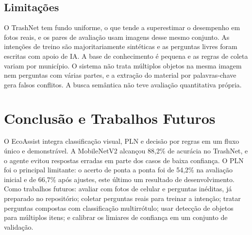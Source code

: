 \documentclass[conference]{IEEEtran}
\begin{document}
\subsection{Limita\c{c}\~oes}
O TrashNet tem fundo uniforme, o que tende a superestimar o desempenho em fotos reais, e os pares de avalia\c{c}\~ao usam imagens desse mesmo conjunto. As inten\c{c}\~oes de treino s\~ao majoritariamente sint\'eticas e as perguntas livres foram escritas com apoio de IA. A base de conhecimento \'e pequena e as regras de coleta variam por munic\'ipio. O sistema n\~ao trata m\'ultiplos objetos na mesma imagem nem perguntas com v\'arias partes, e a extra\c{c}\~ao do material por palavras-chave gera falsos conflitos. A busca sem\^antica n\~ao teve avalia\c{c}\~ao quantitativa pr\'opria.

\section{Conclus\~ao e Trabalhos Futuros}
O EcoAssist integra classifica\c{c}\~ao visual, PLN e decis\~ao por regras em um fluxo \'unico e demonstr\'avel. A MobileNetV2 alcan\c{c}ou 88{,}2\% de acur\'acia no TrashNet, e o agente evitou respostas erradas em parte dos casos de baixa confian\c{c}a. O PLN foi o principal limitante: o acerto de ponta a ponta foi de 54{,}2\% na avalia\c{c}\~ao inicial e de 66{,}7\% ap\'os ajustes, este \'ultimo um resultado de desenvolvimento. Como trabalhos futuros: avaliar com fotos de celular e perguntas in\'editas, j\'a preparado no reposit\'orio; coletar perguntas reais para treinar a inten\c{c}\~ao; tratar perguntas compostas com classifica\c{c}\~ao multirr\'otulo; usar detec\c{c}\~ao de objetos para m\'ultiplos itens; e calibrar os limiares de confian\c{c}a em um conjunto de valida\c{c}\~ao.
\end{document}
